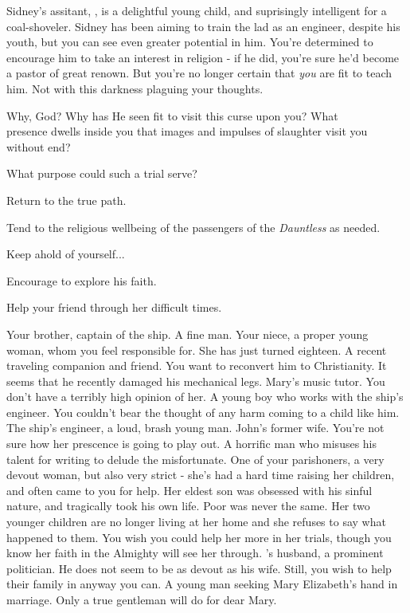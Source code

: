 \documentclass[char]{airship}
\begin{document}
Sidney's assitant, \cRobot{\intro{}}, is a delightful young child, and
suprisingly intelligent for a coal-shoveler. Sidney has been aiming to
train the lad as an engineer, despite his youth, but you can see even
greater potential in him. You're determined to encourage him to take
an interest in religion - if he did, you're sure he'd become a pastor
of great renown. But you're no longer certain that \emph{you} are fit
to teach him. Not with this darkness plaguing your thoughts.

Why, God? Why has He seen fit to visit this curse upon you? What
\\presence dwells inside you that images and impulses of slaughter visit
you without end?

What purpose could such a trial serve?

\begin{itemz}[Goals]
  \item Return \cCowboy{} to the true path.
  \item Tend to the religious wellbeing of the passengers of the {\em Dauntless} as needed.
  \item Keep ahold of yourself...
  \item Encourage \cRobot{} to explore his faith.
  \item Help your friend \cJack{\intro} through her difficult times.
\end{itemz}

\begin{contacts}
  \contact{\cCaptain{}} Your brother, captain of the ship. A fine man.
  \contact{\cThief{}} Your niece, a proper young woman, whom you feel responsible for. She has just turned eighteen.
  \contact{\cCowboy{}} A recent traveling companion and friend. You want to reconvert him to Christianity. It seems that he recently damaged his mechanical legs.
  \contact{\cWhore{}} Mary's music tutor. You don't have a terribly high opinion of her.
  \contact{\cRobot{}} A young boy who works with the ship's engineer. You couldn't bear the thought of any harm coming to a child like him.
  \contact{\cCid{}} The ship's engineer, a loud, brash young man.
  \contact{\cCurie{}} John's former wife. You're not sure how her prescence is going to play out.
  \contact{\cSaboteur{}} A horrific man who misuses his talent for writing to delude the misfortunate.
  \contact{\cJack{}} One of your parishoners, a very devout woman, but also very strict - she's had a hard time raising her children, and often came to you for help. Her eldest son was obsessed with his sinful nature, and tragically took his own life. Poor \cJack{} was never the same. Her two younger children are no longer living at her home and she refuses to say what happened to them. You wish you could help her more in her trials, though you know her faith in the Almighty will see her through.
  \contact{\cNoble{}} \cJack{}'s husband, a prominent politician. He does not seem to be as devout as his wife. Still, you wish to help their family in anyway you can. 
  \contact{\cDealer{}} A young man seeking Mary Elizabeth's hand in marriage. Only a true gentleman will do for dear Mary.
\end{contacts}
\end{document}
